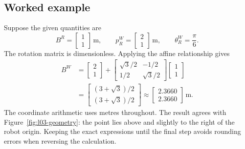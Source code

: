 \subsection{Worked example}
Suppose the given quantities are
\[
 B^R=\begin{bmatrix}1\\1\end{bmatrix}\,\mathrm{m},\qquad
 p_R^W=\begin{bmatrix}2\\1\end{bmatrix}\,\mathrm{m},\qquad
 \theta_R^W=\frac{\pi}{6}.
\]
The rotation matrix is dimensionless. Applying the affine relationship gives
\begin{align}
 B^W
 &=\begin{bmatrix}2\\1\end{bmatrix}
 +\begin{bmatrix}\sqrt3/2&-1/2\\1/2&\sqrt3/2\end{bmatrix}
 \begin{bmatrix}1\\1\end{bmatrix}\\
 &=\begin{bmatrix}(3+\sqrt3)/2\\(3+\sqrt3)/2\end{bmatrix}
 \approx\begin{bmatrix}2.3660\\2.3660\end{bmatrix}\,\mathrm{m}.
 \label{eq:l03-example}
\end{align}
The coordinate arithmetic uses metres throughout. The result agrees with
Figure~\ref{fig:l03-geometry}: the point lies above and slightly to the right
of the robot origin. Keeping the exact expressions until the final step avoids
rounding errors when reversing the calculation.

